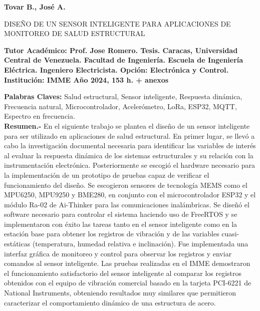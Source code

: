 \documentclass[letterpaper,titlepage,12pt,oneside,spanish,final]{report_eie}
\begin{document}
\newpage
\renewcommand*{\abstract}{\begin{center}\end{center}}
\begin{spacing}{1}
\begin{center}%

\textbf{Tovar B., José A.}

\begin{large}
DISEÑO DE UN SENSOR INTELIGENTE PARA APLICACIONES DE MONITOREO DE SALUD ESTRUCTURAL
\end{large}
\end{center}

\noindent%
\textbf{Tutor Académico: Prof. Jose Romero. Tesis.
Caracas, Universidad Central de Venezuela. Facultad de Ingeniería.
Escuela de Ingeniería Eléctrica. Ingeniero Electricista. Opción: Electrónica y Control. Institución: IMME Año 2024, 153 h. + anexos}

\noindent
\textbf{Palabras Claves:} Salud estructural, Sensor inteligente,  Respuesta dinámica, Frecuencia natural, Microcontrolador, Acelerómetro, LoRa, ESP32, MQTT, Espectro en frecuencia. \\[1ex]

\noindent \textbf{Resumen.-} En el siguiente trabajo se plantea el diseño de un sensor inteligente para ser utilizado en aplicaciones de salud estructural. En primer lugar, se llevó a cabo la investigación documental necesaria para identificar las variables de interés al evaluar la respuesta dinámica de los sistemas estructurales y su relación con la instrumentación electrónica. Posteriormente se escogió el hardware necesario para la implementación de un prototipo de pruebas capaz de verificar el funcionamiento del diseño. Se escogieron sensores de tecnología MEMS como el MPU6250, MPU9250 y BME280, en conjunto con el microcontrolador ESP32 y el módulo Ra-02 de Ai-Thinker para las comunicaciones inalámbricas. Se diseñó el software necesario para controlar el sistema haciendo uso de FreeRTOS y se implementaron con éxito las tareas tanto en el sensor inteligente como en la estación base para obtener los registros de vibración y de las variables cuasi-estáticas (temperatura, humedad relativa e inclinación). Fue implementada una interfaz gráfica de monitoreo y control para observar los registros y enviar comandos al sensor inteligente. Las pruebas realizadas en el IMME demostraron el funcionamiento satisfactorio del sensor inteligente al comparar los registros obtenidos con el equipo de vibración comercial basado en la tarjeta PCI-6221 de National Instruments, obteniendo resultados muy similares que permitieron caracterizar el comportamiento dinámico de una estructura de acero.

\end{spacing}
\end{document}
